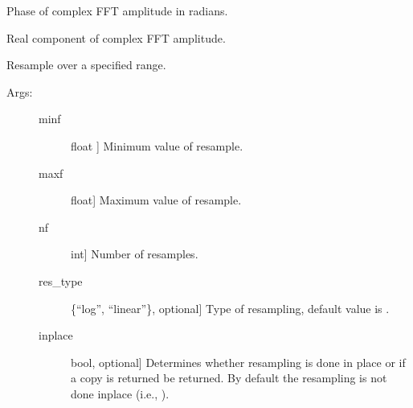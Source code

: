\documentclass[letterpaper,10pt,english,openany,oneside]{sphinxmanual}
\begin{document}
\begin{fulllineitems}
\begin{fulllineitems}
\end{fulllineitems}


\begin{fulllineitems}
\label{\detokenize{index:sigpropy.FourierTransform.phase}}
Phase of complex FFT amplitude in radians.

\end{fulllineitems}


\begin{fulllineitems}
\label{\detokenize{index:sigpropy.FourierTransform.real}}
Real component of complex FFT amplitude.

\end{fulllineitems}


\begin{fulllineitems}
\label{\detokenize{index:sigpropy.FourierTransform.resample}}
Resample  over a specified range.
\begin{description}
\item[{Args:}] \leavevmode\begin{description}
\item[{minf}] \leavevmode{[}float {]}
Minimum value of resample.

\item[{maxf}] \leavevmode{[}float{]}
Maximum value of resample.

\item[{nf}] \leavevmode{[}int{]}
Number of resamples.

\item[{res\_type}] \leavevmode{[}\{“log”, “linear”\}, optional{]}
Type of resampling, default value is .

\item[{inplace}] \leavevmode{[}bool, optional{]}
Determines whether resampling is done in place or 
if a copy is returned be returned. By default the
resampling is not done inplace (i.e., ).


\end{description}
\end{description}
\end{fulllineitems}
\end{fulllineitems}
\end{document}

